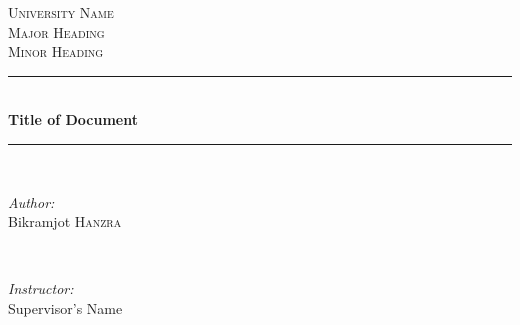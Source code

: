 \documentclass[11pt]{article}
\date{}
\begin{document}
\begin{titlepage}

\newcommand{\HRule}{\rule{\linewidth}{0.5mm}} %

\center %
 

\textsc{\LARGE University Name}\\[1.5cm] %
\textsc{\Large Major Heading}\\[0.5cm] %
\textsc{\large Minor Heading}\\[0.5cm] %


\HRule \\[0.4cm]

{ \huge \bfseries Title of Document}\\[0.4cm] %


\HRule \\[1.5cm]
 

\begin{minipage}{0.4\textwidth}
\begin{flushleft} \large
\emph{Author:}\\
Bikramjot \textsc{Hanzra} \\

\end{flushleft}
\end{minipage}
~
\begin{minipage}{0.4\textwidth}
\begin{flushright} \large
\emph{Instructor:} \\
Supervisor's Name %
\end{flushright}
\end{minipage}\\[2cm]


\end{titlepage}
\end{document}
